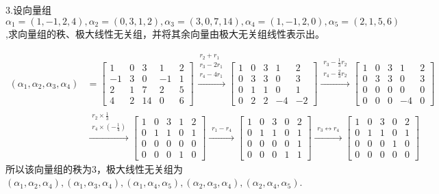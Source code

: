 \documentclass{article}
\begin{document}
3.设向量组$\alpha_{1}=(1,-1,2,4),\alpha_{2}=(0,3,1,2),\alpha_{3}=(3,0,7,14),\alpha_{4}=(1,-1,2,0),\alpha_{5}=(2,1,5,6)$,求向量组的秩、极大线性无关组，并将其余向量由极大无关组线性表示出。

\begin{jie}
\begin{align*}
(\alpha_1,\alpha_2,\alpha_3,\alpha_4)&=
\begin{bmatrix}
  1 & 0 & 3 &1 &2\\
  -1 & 3 & 0&-1&1\\
  2 & 1 & 7&2&5\\
  4 & 2 &14&0&6
\end{bmatrix}
\xrightarrow{\substack{r_{2}+r_{1}\\ r_3-2r_1 \\ r_4-4r_1}}
{
\begin{bmatrix}
  1 & 0 & 3 &1&2\\
  0 & 3 & 3&0&3\\
  0 & 1 & 1&0&1\\
  0 & 2 &2&-4&-2
\end{bmatrix}
}
\xrightarrow{\substack{ r_3-\frac{1}{3}r_2 \\ r_4-\frac{2}{3}r_2}}
{
\begin{bmatrix}
  1 & 0 & 3 &1&2\\
  0 & 3 & 3&0&3\\
  0 & 0 & 0&0&0\\
  0 & 0 &0&-4&0
\end{bmatrix}
}\\
&
\xrightarrow{\substack{ r_2\times\frac{1}{3} \\ r_4\times\left(-\frac{1}{4}\right)}}
{
\begin{bmatrix}
  1 & 0 & 3 &1&2\\
  0 & 1 & 1&0&1\\
  0 & 0 & 0&0&0\\
  0 & 0 &0&1&0
\end{bmatrix}
}
\xrightarrow{\substack{ r_1-r_4}}
{
\begin{bmatrix}
  1 & 0 & 3 &0&2\\
  0 & 1 & 1&0&1\\
  0 & 0 & 0&0&1\\
  0 & 0 &0&1&1
\end{bmatrix}
}
\xrightarrow{\substack{ r_3\leftrightarrow r_4}}
{
\begin{bmatrix}
  1 & 0 & 3 &0&2\\
  0 & 1 & 1&0&1\\
  0 & 0 & 0&1& 0\\
  0 & 0 &0&0& 0
\end{bmatrix}
}
\end{align*}
所以该向量组的秩为$3$，极大线性无关组为$(\alpha_1,\alpha_2,\alpha_4),(\alpha_1,\alpha_3,\alpha_4),(\alpha_1,\alpha_4,\alpha_5),(\alpha_2,\alpha_3,\alpha_4),(\alpha_2,\alpha_4,\alpha_5)$.


\end{jie}
\end{document}
